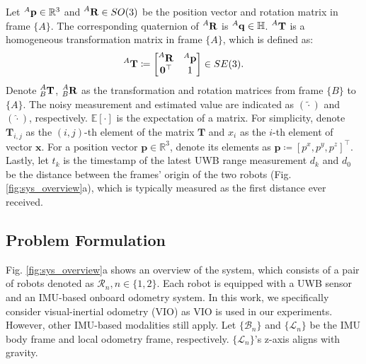 \documentclass[journal]{IEEEtran}
\def\R{\mathbb{R}}
\def\Robot{\mathcal{R}}
\begin{document}
Let $\prescript{A}{}{\mathbf{p}} \in \R^3$ and $\prescript{A}{}{\mathbf{R}} \in SO(3)$ be the position vector and rotation matrix in frame $\{A\}$. The corresponding quaternion of $\prescript{A}{}{\mathbf{R}}$ is $\prescript{A}{}{\mathbf{q}} \in \mathbb{H}$. $\prescript{A}{}{\mathbf{T}}$ is a homogeneous transformation matrix in frame $\{A\}$, which is defined as:
\begin{equation}
    \prescript{A}{}{\mathbf{T}} \coloneqq 
        \begin{bmatrix} 
            \prescript{A}{}{\mathbf{R}} & \prescript{A}{}{\mathbf{p}} \\ 
            \mathbf{0}^\top & 1
        \end{bmatrix}  \in SE(3).
\end{equation}
Denote $\prescript{A}{B}{\mathbf{T}}$, $\prescript{A}{B}{\mathbf{R}}$ as the transformation and rotation matrices from frame $\{B\}$ to $\{A\}$. The noisy measurement and estimated value are indicated as $(\tilde{\cdot})$ and $(\hat{\cdot})$, respectively. $\mathbb{E}[\cdot]$ is the expectation of a matrix. For simplicity, denote $\mathbf{T}_{i,j}$ as the $(i,j)$-th element of the matrix $\mathbf{T}$ and $x_i$ as the $i$-th element of vector $\mathbf{x}$. For a position vector ${\mathbf{p}} \in \R^3$, denote its elements as ${\mathbf{p}} {\coloneqq} [p^x, p^y, p^z]^\top$. Lastly, let  $t_k$ is the timestamp of the latest UWB range measurement $d_k$ and $d_0$ be the distance between the frames' origin of the two robots (Fig. \ref{fig:sys_overview}a), which is typically measured as the first distance ever received.
\subsection{Problem Formulation} \label{subsec:prob_form}

Fig. \ref{fig:sys_overview}a shows an overview of the system, which consists of a pair of robots denoted as $\Robot_n, n \in \{1,2\}$. Each robot is equipped with a UWB sensor and an IMU-based onboard odometry system. In this work, we specifically consider visual-inertial odometry (VIO) as VIO is used in our experiments. However, other IMU-based modalities \cite{shenghai2021ussurvey} still apply. Let $\{\mathcal{B}_n\}$ and $\{\mathcal{L}_n\}$ be the IMU body frame and local odometry frame, respectively. $\{\mathcal{L}_n\}$'s z-axis aligns with gravity.
\end{document}
